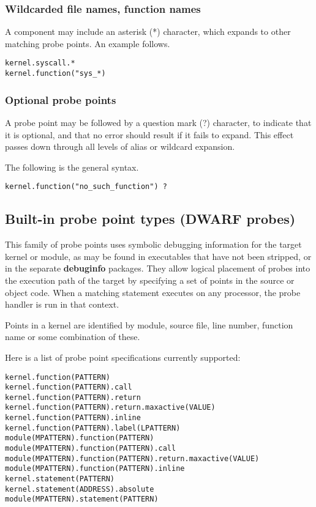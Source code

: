 \documentclass[twoside,english]{article}
\newenvironment{vindent}
{\begin{list}{}{\setlength{\listparindent}{6pt}}
\item[]}
{\end{list}}
\begin{document}
\subsubsection{Wildcarded file names, function names}
A component may include an asterisk ({*}) character, which expands to other
matching probe points. An example follows.

\begin{vindent}
\begin{verbatim}
kernel.syscall.*
kernel.function("sys_*)
\end{verbatim}
\end{vindent}

\subsubsection{Optional probe points\label{sub:Optional-probe-points}}
A probe point may be followed by a question mark (?) character, to indicate
that it is optional, and that no error should result if it fails to expand.
This effect passes down through all levels of alias or wildcard expansion.

The following is the general syntax.

\begin{vindent}
\begin{verbatim}
kernel.function("no_such_function") ?
\end{verbatim}
\end{vindent}

\subsection{Built-in probe point types (DWARF probes)}
This family of probe points uses symbolic debugging information for the target
kernel or module, as may be found in executables that have not
been stripped, or in the separate \textbf{debuginfo} packages. They allow
logical placement of probes into the execution path of the target
by specifying a set of points in the source or object code. When a matching
statement executes on any processor, the probe handler is run in that context.

Points in a kernel are identified by module, source file, line number, function
name or some combination of these.

Here is a list of probe point specifications currently supported:

\begin{vindent}
\begin{verbatim}
kernel.function(PATTERN)
kernel.function(PATTERN).call
kernel.function(PATTERN).return
kernel.function(PATTERN).return.maxactive(VALUE)
kernel.function(PATTERN).inline
kernel.function(PATTERN).label(LPATTERN)
module(MPATTERN).function(PATTERN)
module(MPATTERN).function(PATTERN).call
module(MPATTERN).function(PATTERN).return.maxactive(VALUE)
module(MPATTERN).function(PATTERN).inline
kernel.statement(PATTERN)
kernel.statement(ADDRESS).absolute
module(MPATTERN).statement(PATTERN)
\end{verbatim}
\end{vindent}
\end{document}
